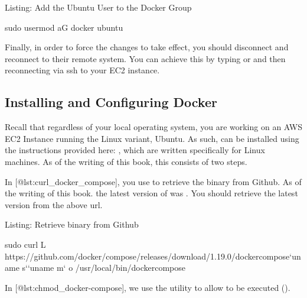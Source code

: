 \documentclass[letterpaper,10pt,english]{sphinxmanual}
\begin{document}
Listing: Add the Ubuntu User to the Docker Group

%
\begin{sphinxVerbatim}[commandchars=\\\{\}]
\PYGZdl{} sudo usermod \PYGZhy{}aG docker ubuntu
\end{sphinxVerbatim}

Finally, in order to force the changes to take effect, you should
disconnect and reconnect to their remote system. You can achieve this by
typing  or  and then reconnecting via ssh to your EC2
instance.


\subsection{Installing and Configuring Docker}
\label{\detokenize{02-elastic-compute-cloud:Installing-and-Configuring-Docker}}
Recall that regardless of your local operating system, you are working
on an AWS EC2 Instance running the Linux variant, Ubuntu. As such,
can be installed using the instructions provided
here: , which are written
specifically for Linux machines. As of the writing of this book, this
consists of two steps.

In {[}@lst:curl\_docker\_compose{]}, you use  to retrieve the
 binary from Github. As of the writing of this book.
the latest version of  was . You should
retrieve the latest version from the above url.

Listing: Retrieve  binary from Github

%
\begin{sphinxVerbatim}[commandchars=\\\{\}]
\PYGZdl{} sudo curl \PYGZhy{}L https://github.com/docker/compose/releases/download/1.19.0/docker\PYGZhy{}compose\PYGZhy{}{}`uname \PYGZhy{}s{}`\PYGZhy{}{}`uname \PYGZhy{}m{}` \PYGZhy{}o /usr/local/bin/docker\PYGZhy{}compose
\end{sphinxVerbatim}

In {[}@lst:chmod\_docker-compose{]}, we use the
utility to allow  to be executed ().
\end{document}
